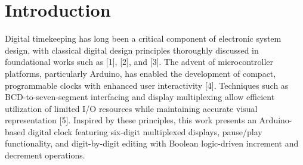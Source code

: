\section{Introduction}
Digital timekeeping has long been a critical component of electronic system design, with classical digital design principles thoroughly discussed in foundational works such as [1], [2], and [3]. The advent of microcontroller platforms, particularly Arduino, has enabled the development of compact, programmable clocks with enhanced user interactivity [4]. Techniques such as BCD-to-seven-segment interfacing and display multiplexing allow efficient utilization of limited I/O resources while maintaining accurate visual representation [5]. Inspired by these principles, this work presents an Arduino-based digital clock featuring six-digit multiplexed displays, pause/play functionality, and digit-by-digit editing with Boolean logic-driven increment and decrement operations.

